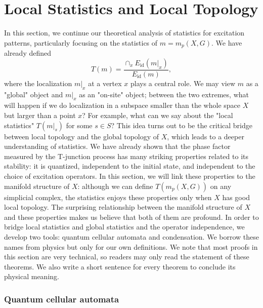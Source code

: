 \documentclass[reprint, amsmath, amssymb, showpacs, floatfix, longbibliography, aps, twocolumn, superscriptaddress, nofootinbib]{revtex4-2}
\newcommand{\id}{{\operatorname{id}}}
\theoremstyle{definition}
\begin{document}
\section{Local Statistics and Local Topology}\label{secUniversal}

In this section, we continue our theoretical analysis of statistics for excitation patterns, particularly focusing on the statistics of $m=m_p(X,G)$. We have already defined
\begin{equation*}
	T(m)=\frac{\cap_{x}E_\id(m|_x)}{E_\id(m)},
\end{equation*}
where the localization $m|_x$ at a vertex $x$ plays a central role. We may view $m$ as a "global" object and $m|_x$ as an "on-site" object; between the two extremes, what will happen if we do localization in a subspace smaller than the whole space $X$ but larger than a point $x$? For example, what can we say about the "local statistics" $T(m|_s)$ for some $s\in S$? This idea turns out to be the critical bridge between local topology and the global topology of $X$, which leads to a deeper understanding of statistics. We have already shown that the phase factor measured by the T-junction process has many striking properties related to its stability: it is quantized, independent to the initial state, and independent to the choice of excitation operators. In this section, we will link these properties to the manifold structure of $X$: although we can define $T(m_p(X,G))$ on any simplicial complex, the statistics enjoys these properties only when $X$ has good local topology. The surprising relationship between the manifold structure of $X$ and these properties makes us believe that both of them are profound. In order to bridge local statistics and global statistics and the operator independence, we develop two tools: quantum cellular automata and condensation. We borrow these names from physics but only for our own definitions. We note that most proofs in this section are very technical, so readers may only read the statement of these theorems. We also write a short sentence for every theorem to conclude its physical meaning.


\subsubsection{Quantum cellular automata}\label{subsecQCA}
\end{document}
